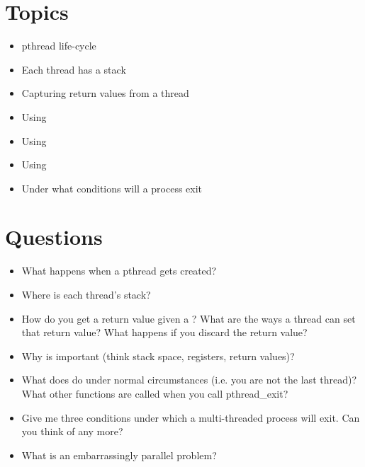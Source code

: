 \section{Topics}

\begin{itemize}
\tightlist
\item
pthread life-cycle
\item
Each thread has a stack
\item
Capturing return values from a thread
\item
Using 
\item
Using 
\item
Using 
\item
Under what conditions will a process exit
\end{itemize}

\section{Questions}

\begin{itemize}
\tightlist
\item
What happens when a pthread gets created?
\item
Where is each thread's stack?
\item
How do you get a return value given a ? What are the ways a thread can set that return value? What happens if you discard the return value?
\item
Why is  important (think stack space, registers, return values)?
\item
What does  do under normal circumstances (i.e. you are not the last thread)? What other functions are called when you call pthread\_exit?
\item
Give me three conditions under which a multi-threaded process will exit. Can you think of any more?
\item
What is an embarrassingly parallel problem?
\end{itemize}



